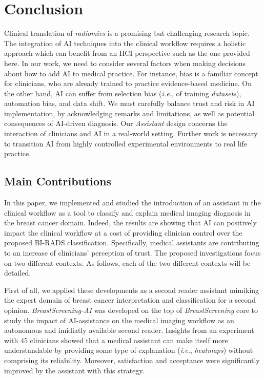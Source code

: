 \section{Conclusion}
\label{sec:conclusion}

Clinical translation of {\it radiomics} is a promising but challenging research topic.
The integration of AI techniques into the clinical workflow requires a holistic approach which can benefit from an HCI perspective such as the one provided here.
In our work, we need to consider several factors when making decisions about how to add AI to medical practice.
For instance, bias is a familiar concept for clinicians, who are already trained to practice evidence-based medicine.
On the other hand, AI can suffer from selection bias ({\it i.e.}, of training {\it datasets}), automation bias, and data shift.
We must carefully balance trust and risk in AI implementation, by acknowledging remarks and limitations, as well as potential consequences of AI-driven diagnosis.
Our {\it Assistant} design concerns the interaction of clinicians and AI in a real-world setting.
Further work is necessary to transition AI from highly controlled experimental environments to real life practice.

\subsection{Main Contributions}

In this paper, we implemented and studied the introduction of an assistant in the clinical workflow as a tool to classify and explain medical imaging diagnosis in the breast cancer domain.
Indeed, the results are showing that AI can positively impact the clinical workflow at a cost of providing clinician control over the proposed BI-RADS classification.
Specifically, medical assistants are contributing to an increase of clinicians' perception of trust.
The proposed investigations focus on two different contexts.
As follows, each of the two different contexts will be detailed.

First of all, we applied these developments as a second reader assistant mimiking the expert domain of breast cancer interpretation and classification for a second opinion.
{\it BreastScreening-AI} was developed on the top of {\it BreastScreening} core to study the impact of AI-assistance on the medical imaging workflow as an autonomous and imidiatly available second reader.
Insights from an experiment with 45 clinicians showed that a medical assistant can make itself more understandable by providing some type of explanation ({\it i.e.}, {\it heatmaps}) without comprising its reliability.
Moreover, satisfaction and acceptance were significantly improved by the assistant with this strategy.


